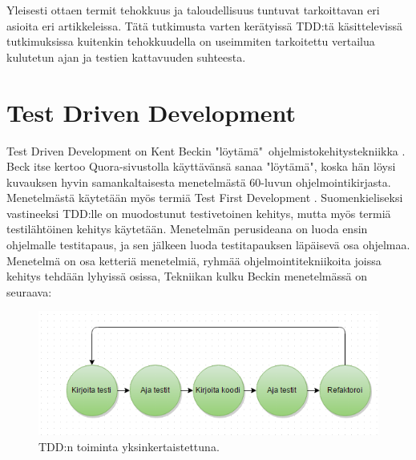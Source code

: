 \documentclass[finnish]{tktltiki2}
\theoremstyle{definition}
\theoremstyle{remark}
\begin{document}
Yleisesti ottaen termit tehokkuus ja taloudellisuus tuntuvat tarkoittavan eri asioita eri artikkeleissa. Tätä tutkimusta varten kerätyissä TDD:tä käsittelevissä tutkimuksissa kuitenkin tehokkuudella on useimmiten tarkoitettu vertailua kulutetun ajan ja testien kattavuuden suhteesta. 





\section{Test Driven Development}


Test Driven Development on Kent Beckin "löytämä"\  ohjelmistokehitystekniikka \cite{Beck03}. Beck itse kertoo Quora-sivustolla \cite{QuoraBeck} käyttävänsä sanaa "löytämä", koska hän löysi kuvauksen hyvin samankaltaisesta menetelmästä 60-luvun ohjelmointikirjasta. Menetelmästä käytetään myös termiä Test First Development \cite{Crispin06}. Suomenkieliseksi vastineeksi TDD:lle on muodostunut testivetoinen kehitys, mutta myös termiä testilähtöinen kehitys käytetään. Menetelmän perusideana on luoda ensin ohjelmalle testitapaus, ja sen jälkeen luoda testitapauksen läpäisevä osa ohjelmaa. Menetelmä on osa ketteriä menetelmiä, ryhmää ohjelmointitekniikoita joissa kehitys tehdään lyhyissä osissa, Tekniikan kulku Beckin menetelmässä on seuraava:

\begin{figure}[ht]
\includegraphics[width=\textwidth]{tdd}
\caption{TDD:n toiminta yksinkertaistettuna.}
\end{figure}
\end{document}
